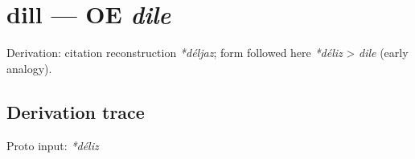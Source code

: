 \documentclass[
  british,
  a4paper,
  openany]{book}
\providecommand{\texorpdfstring}[2]{#1}
\begin{document}
\section{\texorpdfstring{dill --- OE
\emph{dile}}{dill --- OE dile}}\label{dill-oe-dile}


Derivation: citation reconstruction \emph{*déljaz}; form followed here
\emph{*déliz} \textgreater{} \emph{dile} (early analogy).

\subsection{Derivation trace}\label{derivation-trace-78}

Proto input: \emph{*déliz}

\begingroup
\setlength{\fboxsep}{6pt}
\end{document}
